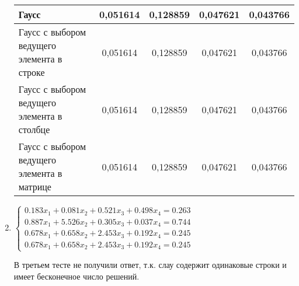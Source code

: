 \documentclass[14pt, a4paper]{extarticle}
\begin{document}
\begin{enumerate}
\begin{center}
\begin{tabular}{ |m{10em}|c|c|c|c| }
						Гаусс & 0,051614 & 0,128859 & 0,047621 & 0,043766\\
						\hline
						Гаусс с выбором ведущего элемента в строке  & 0,051614 & 0,128859 & 0,047621 & 0,043766\\
						\hline
						Гаусс с выбором ведущего элемента в столбце  & 0,051614 & 0,128859 & 0,047621 & 0,043766\\
						\hline
						Гаусс с выбором ведущего элемента в матрице & 0,051614 & 0,128859 & 0,047621 & 0,043766\\
						\hline
					\end{tabular}
				\end{center}
			\item $ \begin{cases}
				0.183x_1 + 0.081x_2 + 0.521x_3 + 0.498x_4 = 0.263\\
				0.887x_1 + 5.526x_2 + 0.305x_3 + 0.037x_4 = 0.744\\
				0.678x_1 + 0.658x_2 + 2.453x_3 + 0.192x_4 = 0.245\\
				0.678x_1 + 0.658x_2 + 2.453x_3 + 0.192x_4 = 0.245
			\end{cases}$
		
			В третьем тесте не получили ответ, т.к. слау содержит одинаковые строки и имеет бесконечное число решений.
		\end{enumerate}
	
	\pagebreak
\end{document}
